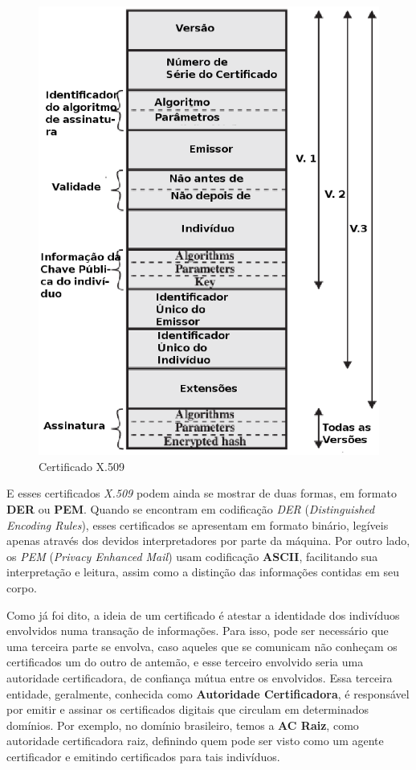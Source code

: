 	\begin{figure}[h]
		\centering
		\label{img07}
		\caption{Certificado X.509 \cite[p.~431]{stallings11}}
		\includegraphics[keepaspectratio=true,scale=0.7]{figuras/img04.eps}
	\end{figure}

	E esses certificados \textit{X.509} podem ainda se mostrar de duas formas, em formato \textbf{DER} ou \textbf{PEM}. Quando se encontram em codificação \textit{DER} (\textit{Distinguished Encoding Rules}), esses certificados se apresentam em formato binário, legíveis apenas através dos devidos interpretadores por parte da máquina. Por outro lado, os \textit{PEM} (\textit{Privacy Enhanced Mail}) usam codificação \textbf{ASCII}, facilitando sua interpretação e leitura, assim como a distinção das informações contidas em seu corpo.

	Como já foi dito, a ideia de um certificado é atestar a identidade dos indivíduos envolvidos numa transação de informações. Para isso, pode ser necessário que uma terceira parte se envolva, caso aqueles que se comunicam não conheçam os certificados um do outro de antemão, e esse terceiro envolvido seria uma autoridade certificadora, de confiança mútua entre os envolvidos. Essa terceira entidade, geralmente, conhecida como \textbf{Autoridade Certificadora}, é responsável por emitir e assinar os certificados digitais que circulam em determinados domínios. Por exemplo, no domínio brasileiro, temos a \textbf{AC Raiz}, como autoridade certificadora raiz, definindo quem pode ser visto como um agente certificador e emitindo certificados para tais indivíduos.

